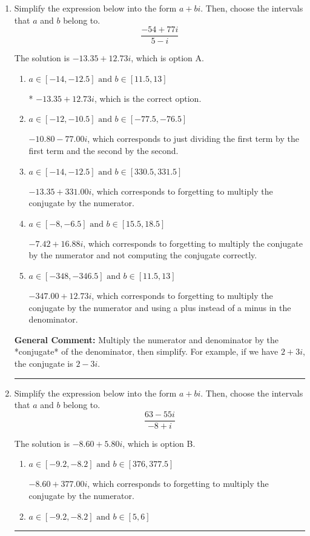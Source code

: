 \documentclass{extbook}[14pt]
\newcommand{\litem}[1]{\item #1

\rule{\textwidth}{0.4pt}}
\begin{document}
\begin{enumerate}\litem{
Simplify the expression below into the form $a+bi$. Then, choose the intervals that $a$ and $b$ belong to.
\[ \frac{-54 + 77 i}{5 - i} \]

The solution is \( -13.35  + 12.73 i \), which is option A.\begin{enumerate}[label=\Alph*.]
\item \( a \in [-14, -12.5] \text{ and } b \in [11.5, 13] \)

* $-13.35  + 12.73 i$, which is the correct option.
\item \( a \in [-12, -10.5] \text{ and } b \in [-77.5, -76.5] \)

 $-10.80  - 77.00 i$, which corresponds to just dividing the first term by the first term and the second by the second.
\item \( a \in [-14, -12.5] \text{ and } b \in [330.5, 331.5] \)

 $-13.35  + 331.00 i$, which corresponds to forgetting to multiply the conjugate by the numerator.
\item \( a \in [-8, -6.5] \text{ and } b \in [15.5, 18.5] \)

 $-7.42  + 16.88 i$, which corresponds to forgetting to multiply the conjugate by the numerator and not computing the conjugate correctly.
\item \( a \in [-348, -346.5] \text{ and } b \in [11.5, 13] \)

 $-347.00  + 12.73 i$, which corresponds to forgetting to multiply the conjugate by the numerator and using a plus instead of a minus in the denominator.
\end{enumerate}

\textbf{General Comment:} Multiply the numerator and denominator by the *conjugate* of the denominator, then simplify. For example, if we have $2+3i$, the conjugate is $2-3i$.
}
\litem{
Simplify the expression below into the form $a+bi$. Then, choose the intervals that $a$ and $b$ belong to.
\[ \frac{63 - 55 i}{-8 + i} \]

The solution is \( -8.60  + 5.80 i \), which is option B.\begin{enumerate}[label=\Alph*.]
\item \( a \in [-9.2, -8.2] \text{ and } b \in [376, 377.5] \)

 $-8.60  + 377.00 i$, which corresponds to forgetting to multiply the conjugate by the numerator.
\item \( a \in [-9.2, -8.2] \text{ and } b \in [5, 6] \)


\end{enumerate}}
\end{enumerate}
\end{document}
